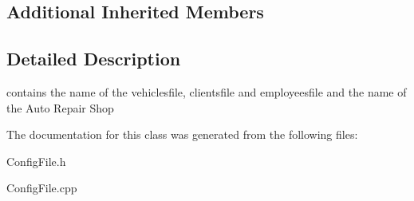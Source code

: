 \subsection*{Additional Inherited Members}


\subsection{Detailed Description}
contains the name of the vehiclesfile, clientsfile and employeesfile and the name of the Auto Repair Shop 

The documentation for this class was generated from the following files\+:\begin{DoxyCompactItemize}
\item 
Config\+File.\+h\item 
Config\+File.\+cpp\end{DoxyCompactItemize}
